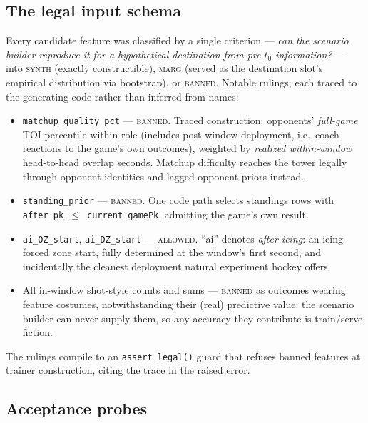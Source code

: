 \documentclass[11pt]{article}
\begin{document}
\subsection{The legal input schema}\label{sec:legal}

Every candidate feature was classified by a single criterion --- \emph{can the scenario
builder reproduce it for a hypothetical destination from pre-$t_0$ information?} --- into
\textsc{synth} (exactly constructible), \textsc{marg} (served as the destination slot's
empirical distribution via bootstrap), or \textsc{banned}. Notable rulings, each traced to
the generating code rather than inferred from names:
\begin{itemize}[nosep]
\item \texttt{matchup\_quality\_pct} --- \textsc{banned}. Traced construction: opponents'
\emph{full-game} TOI percentile within role (includes post-window deployment, i.e.\ coach
reactions to the game's own outcomes), weighted by \emph{realized within-window}
head-to-head overlap seconds. Matchup difficulty reaches the tower legally through opponent
identities and lagged opponent priors instead.
\item \texttt{standing\_prior} --- \textsc{banned}. One code path selects standings rows
with \texttt{after\_pk $\le$ current gamePk}, admitting the game's own result.
\item \texttt{ai\_OZ\_start}, \texttt{ai\_DZ\_start} --- \textsc{allowed}. ``ai'' denotes
\emph{after icing}: an icing-forced zone start, fully determined at the window's first
second, and incidentally the cleanest deployment natural experiment hockey offers.
\item All in-window shot-style counts and sums --- \textsc{banned} as outcomes wearing
feature costumes, notwithstanding their (real) predictive value: the scenario builder can
never supply them, so any accuracy they contribute is train/serve fiction.
\end{itemize}
The rulings compile to an \texttt{assert\_legal()} guard that refuses banned features at
trainer construction, citing the trace in the raised error.

\subsection{Acceptance probes}\label{sec:probes}
\end{document}
